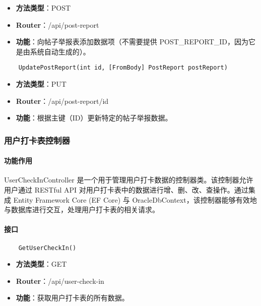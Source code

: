 \begin{itemize}
	\item \textbf{方法类型}：POST
	\item \textbf{Router}：/api/post-report
	\item \textbf{功能}：向帖子举报表添加数据项（不需要提供 POST\_REPORT\_ID，因为它是由系统自动生成的）。
\end{itemize}

\begin{verbatim}
	UpdatePostReport(int id, [FromBody] PostReport postReport)
\end{verbatim}

\begin{itemize}
	\item \textbf{方法类型}：PUT
	\item \textbf{Router}：/api/post-report/{id}
	\item \textbf{功能}：根据主键（ID）更新特定的帖子举报数据。
\end{itemize}

\subsubsection{用户打卡表控制器}

\paragraph{功能作用}

UserCheckInController 是一个用于管理用户打卡数据的控制器类。该控制器允许用户通过 RESTful API 对用户打卡表中的数据进行增、删、改、查操作。通过集成 Entity Framework Core (EF Core) 与 OracleDbContext，该控制器能够有效地与数据库进行交互，处理用户打卡表的相关请求。

\paragraph{接口}

\begin{verbatim}
	GetUserCheckIn()
\end{verbatim}

\begin{itemize}
	\item \textbf{方法类型}：GET
	\item \textbf{Router}：/api/user-check-in
	\item \textbf{功能}：获取用户打卡表的所有数据。
\end{itemize}

